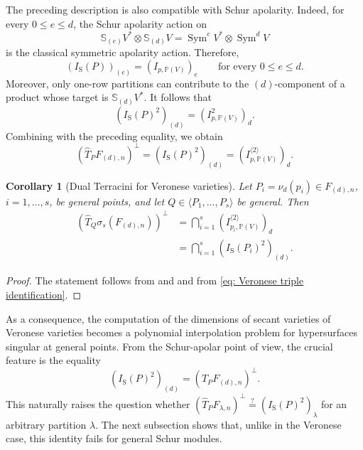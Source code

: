 \documentclass[a4paper,reqno]{amsart}
\theoremstyle{plainnopunct}
\newtheorem{corollary}[corollary]{Corollary}
\theoremstyle{definitionnopunct}
\renewcommand{\P}{\mathbb{P}}
\renewcommand{\S}{\mathbb{S}}
\newcommand{\Sym}{\operatorname{Sym}}
\begin{document}
The preceding description is also compatible with Schur apolarity.
Indeed, for every $0\leq e\leq d$, the Schur apolarity action on
\[
\S_{(e)}V^*\otimes\S_{(d)}V
=
\Sym^eV^*\otimes\Sym^dV
\]
is the classical symmetric apolarity action. Therefore,
\[\left(
I_{\mathrm S}(P)
\right)_{(e)}
=
\left(
I_{p,\P(V)}
\right)_e
\qquad
\text{for every }0\leq e\leq d.
\]Moreover, only one-row partitions can contribute to the $(d)$-component of a product whose target is $\S_{(d)}V^*$. It follows that
\[\left(
I_{\mathrm S}(P)^2
\right)_{(d)}
=
\left(
I_{p,\P(V)}^2
\right)_d.
\]Combining  with the preceding equality, we obtain
\begin{equation}
\label{eq: Veronese triple identification}
\left(
\widehat T_PF_{(d),n}
\right)^\perp
=
\left(
I_{\mathrm S}(P)^2
\right)_{(d)}
=
\left(
I_{p,\P(V)}^{\langle2\rangle}
\right)_d.
\end{equation}

\begin{corollary}[Dual Terracini for Veronese varieties]
\label{cor: dual Terracini Veronese}
Let $P_i=\nu_d(p_i)\in F_{(d),n}$, $i=1,\ldots,s$, be general points, and let $Q\in
\langle P_1,\ldots,P_s\rangle$ be general. Then
\begin{align*}
\left(
\widehat T_Q\sigma_s(F_{(d),n})
\right)^\perp
&=
\bigcap_{i=1}^s
\left(
I_{p_i,\P(V)}^{\langle2\rangle}
\right)_d\\
&=
\bigcap_{i=1}^s
\left(
I_{\mathrm S}(P_i)^2
\right)_{(d)}.
\end{align*}
\end{corollary}

\begin{proof}
The statement follows from
 and  and from
\eqref{eq: Veronese triple identification}.
\end{proof}

As a consequence, the computation of the dimensions of secant varieties of Veronese varieties becomes a polynomial interpolation problem for hypersurfaces singular at general points. From the Schur-apolar point of view, the crucial feature is the equality
\[
\left(
I_{\mathrm S}(P)^2
\right)_{(d)}
=
\left(
\widehat T_PF_{(d),n}
\right)^\perp.
\]
This naturally raises the question whether $\left( \widehat T_PF_{\lambda,n} \right)^\perp \stackrel{?}{=} \left( I_{\mathrm S}(P)^2 \right)_\lambda$ for an arbitrary partition $\lambda$. The next subsection shows that, unlike in the Veronese case, this identity fails for general Schur modules.
\end{document}
